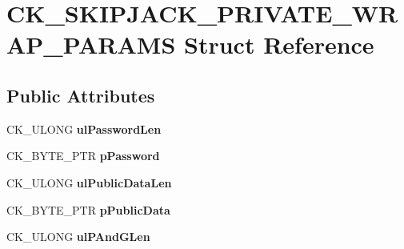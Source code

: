 \hypertarget{struct_c_k___s_k_i_p_j_a_c_k___p_r_i_v_a_t_e___w_r_a_p___p_a_r_a_m_s}{}\section{C\+K\+\_\+\+S\+K\+I\+P\+J\+A\+C\+K\+\_\+\+P\+R\+I\+V\+A\+T\+E\+\_\+\+W\+R\+A\+P\+\_\+\+P\+A\+R\+A\+MS Struct Reference}
\label{struct_c_k___s_k_i_p_j_a_c_k___p_r_i_v_a_t_e___w_r_a_p___p_a_r_a_m_s}
\subsection*{Public Attributes}
\begin{DoxyCompactItemize}
\item 
\mbox{\label{struct_c_k___s_k_i_p_j_a_c_k___p_r_i_v_a_t_e___w_r_a_p___p_a_r_a_m_s_a319a7db185614d211dc6470d8de2cf93}} 
C\+K\+\_\+\+U\+L\+O\+NG {\bfseries ul\+Password\+Len}
\item 
\mbox{\label{struct_c_k___s_k_i_p_j_a_c_k___p_r_i_v_a_t_e___w_r_a_p___p_a_r_a_m_s_a974a08377afe376a0c4ad5a8e4c808c1}} 
C\+K\+\_\+\+B\+Y\+T\+E\+\_\+\+P\+TR {\bfseries p\+Password}
\item 
\mbox{\label{struct_c_k___s_k_i_p_j_a_c_k___p_r_i_v_a_t_e___w_r_a_p___p_a_r_a_m_s_a0ced2646d8f0976f31c7c543be1aebee}} 
C\+K\+\_\+\+U\+L\+O\+NG {\bfseries ul\+Public\+Data\+Len}
\item 
\mbox{\label{struct_c_k___s_k_i_p_j_a_c_k___p_r_i_v_a_t_e___w_r_a_p___p_a_r_a_m_s_af683f1fa6750734675145a8c2ef68abc}} 
C\+K\+\_\+\+B\+Y\+T\+E\+\_\+\+P\+TR {\bfseries p\+Public\+Data}
\item 
\mbox{\label{struct_c_k___s_k_i_p_j_a_c_k___p_r_i_v_a_t_e___w_r_a_p___p_a_r_a_m_s_a82c643b49b5d57e87177bd41b2748ece}} 
C\+K\+\_\+\+U\+L\+O\+NG {\bfseries ul\+P\+And\+G\+Len}

\end{DoxyCompactItemize}
